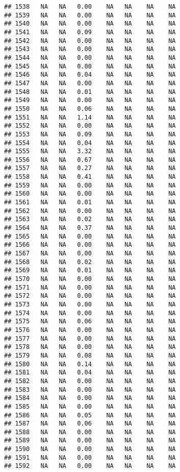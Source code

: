 \documentclass{article}\usepackage{graphicx, color}
\makeatletter
\newenvironment{kframe}{%
 \def\at@end@of@kframe{}%
 \ifinner\ifhmode%
  \def\at@end@of@kframe{\end{minipage}}%
  \begin{minipage}{\columnwidth}%
 \fi\fi%
 \def\FrameCommand##1{\hskip\@totalleftmargin \hskip-\fboxsep
 \colorbox{shadecolor}{##1}\hskip-\fboxsep
     \hskip-\linewidth \hskip-\@totalleftmargin \hskip\columnwidth}%
 \MakeFramed {\advance\hsize-\width
   \@totalleftmargin\z@ \linewidth\hsize
   \@setminipage}}%
 {\par\unskip\endMakeFramed%
 \at@end@of@kframe}
\newenvironment{knitrout}{}{} %
\makeatother
\begin{document}
\begin{knitrout}
\begin{kframe}
\begin{verbatim}
## 1538   NA   NA   0.00    NA   NA    NA    NA
## 1539   NA   NA   0.00    NA   NA    NA    NA
## 1540   NA   NA   0.00    NA   NA    NA    NA
## 1541   NA   NA   0.09    NA   NA    NA    NA
## 1542   NA   NA   0.00    NA   NA    NA    NA
## 1543   NA   NA   0.00    NA   NA    NA    NA
## 1544   NA   NA   0.00    NA   NA    NA    NA
## 1545   NA   NA   0.00    NA   NA    NA    NA
## 1546   NA   NA   0.04    NA   NA    NA    NA
## 1547   NA   NA   0.00    NA   NA    NA    NA
## 1548   NA   NA   0.01    NA   NA    NA    NA
## 1549   NA   NA   0.00    NA   NA    NA    NA
## 1550   NA   NA   0.06    NA   NA    NA    NA
## 1551   NA   NA   1.14    NA   NA    NA    NA
## 1552   NA   NA   0.00    NA   NA    NA    NA
## 1553   NA   NA   0.09    NA   NA    NA    NA
## 1554   NA   NA   0.04    NA   NA    NA    NA
## 1555   NA   NA   3.32    NA   NA    NA    NA
## 1556   NA   NA   0.67    NA   NA    NA    NA
## 1557   NA   NA   0.27    NA   NA    NA    NA
## 1558   NA   NA   0.41    NA   NA    NA    NA
## 1559   NA   NA   0.00    NA   NA    NA    NA
## 1560   NA   NA   0.00    NA   NA    NA    NA
## 1561   NA   NA   0.01    NA   NA    NA    NA
## 1562   NA   NA   0.00    NA   NA    NA    NA
## 1563   NA   NA   0.02    NA   NA    NA    NA
## 1564   NA   NA   0.37    NA   NA    NA    NA
## 1565   NA   NA   0.00    NA   NA    NA    NA
## 1566   NA   NA   0.00    NA   NA    NA    NA
## 1567   NA   NA   0.00    NA   NA    NA    NA
## 1568   NA   NA   0.02    NA   NA    NA    NA
## 1569   NA   NA   0.01    NA   NA    NA    NA
## 1570   NA   NA   0.00    NA   NA    NA    NA
## 1571   NA   NA   0.00    NA   NA    NA    NA
## 1572   NA   NA   0.00    NA   NA    NA    NA
## 1573   NA   NA   0.00    NA   NA    NA    NA
## 1574   NA   NA   0.00    NA   NA    NA    NA
## 1575   NA   NA   0.06    NA   NA    NA    NA
## 1576   NA   NA   0.00    NA   NA    NA    NA
## 1577   NA   NA   0.00    NA   NA    NA    NA
## 1578   NA   NA   0.00    NA   NA    NA    NA
## 1579   NA   NA   0.08    NA   NA    NA    NA
## 1580   NA   NA   0.14    NA   NA    NA    NA
## 1581   NA   NA   0.04    NA   NA    NA    NA
## 1582   NA   NA   0.00    NA   NA    NA    NA
## 1583   NA   NA   0.00    NA   NA    NA    NA
## 1584   NA   NA   0.00    NA   NA    NA    NA
## 1585   NA   NA   0.00    NA   NA    NA    NA
## 1586   NA   NA   0.05    NA   NA    NA    NA
## 1587   NA   NA   0.06    NA   NA    NA    NA
## 1588   NA   NA   0.00    NA   NA    NA    NA
## 1589   NA   NA   0.00    NA   NA    NA    NA
## 1590   NA   NA   0.00    NA   NA    NA    NA
## 1591   NA   NA   0.00    NA   NA    NA    NA
## 1592   NA   NA   0.00    NA   NA    NA    NA

\end{verbatim}
\end{kframe}
\end{knitrout}
\end{document}
